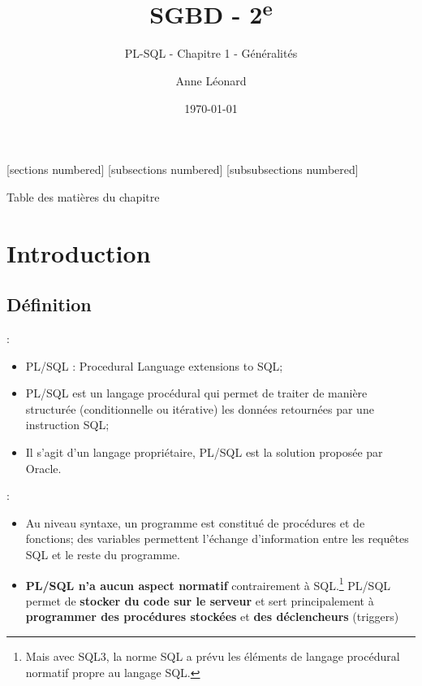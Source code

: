 \documentclass[10pt]{beamer}
\title{SGBD - 2\textsuperscript{e}}
\subtitle{PL-SQL - Chapitre 1 - Généralités}
\date{\today}
\author{Anne Léonard}
\institute{Haute École de la Province de Liège}
\begin{document}
\maketitle

[sections numbered]
[subsections numbered]
[subsubsections numbered]
\begin{frame}[allowframebreaks]{Table des matières du chapitre}
    \tableofcontents[subsectionstyle=show/show/hide,subsubsectionstyle=show/show/hide,]
\end{frame}

\section{Introduction}
\tocss
\subsection{Définition}
\begin{frame}{\secname : \subsecname}
    \begin{itemize}
        \item PL/SQL : Procedural Language extensions to SQL;
        \item PL/SQL est un langage procédural qui permet de traiter de manière structurée (conditionnelle ou itérative) les données retournées par une instruction SQL;
        \item Il s'agit d'un langage propriétaire, PL/SQL est la solution proposée par Oracle.
    \end{itemize}
\end{frame}

\begin{frame}{\secname : \subsecname}
    \begin{itemize}
        \item Au niveau syntaxe, un programme est constitué de procédures et de fonctions; des variables permettent l'échange d'information entre les requêtes SQL et le reste du programme.
        \item \textbf{PL/SQL n'a aucun aspect normatif} contrairement à SQL.\footnote{Mais avec SQL3, la norme SQL a prévu les éléments de langage procédural normatif propre au langage SQL.}
              PL/SQL permet de \textbf{stocker du code sur le serveur} et sert principalement à \textbf{programmer des procédures stockées} et \textbf{des déclencheurs} (triggers)
    \end{itemize}
\end{frame}
\end{document}
